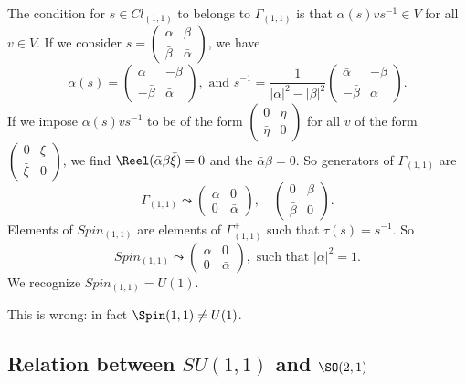 The condition for $s\in Cl_{(1,1)}$ to belongs to $\Gamma_{(1,1)}$ is that $\alpha(s)v s^{-1}\in V$ for all $v\in V$. If we consider $s=
\begin{pmatrix}
\alpha&\beta\\\bar\beta&\bar\alpha
\end{pmatrix}$,
we have
\[ 
  \alpha(s)=
\begin{pmatrix}
\alpha&-\beta\\-\bar\beta&\bar\alpha
\end{pmatrix},
\text{ and }
s^{-1}=\frac{1}{ | \alpha |^2-| \beta |^2 }
\begin{pmatrix}
\bar\alpha&-\beta\\-\bar\beta&\alpha
\end{pmatrix}.
\]
If we impose $\alpha(s)v s^{-1}$ to be of the form $\begin{pmatrix}
0&\eta\\\bar\eta&0
\end{pmatrix}$ for all $v$ of the form $\begin{pmatrix}
0&\xi\\\bar\xi&0
\end{pmatrix}$, we find $\Reel(\bar\alpha\beta\bar\xi)=0$ and the $\bar\alpha\beta=0$. So generators of $\Gamma_{(1,1)}$ are
\begin{equation}
\Gamma_{(1,1)}\leadsto
\begin{pmatrix}
\alpha&0\\0&\bar\alpha
\end{pmatrix},\quad
\begin{pmatrix}
0&\beta\\\bar\beta&0
\end{pmatrix}.
\end{equation}
Elements of $Spin_{(1,1)}$ are elements of $\Gamma_{(1,1)}^+$ such that $\tau(s)=s^{-1}$. So
\begin{equation}
Spin_{(1,1)}\leadsto
\begin{pmatrix}
\alpha&0\\0&\bar\alpha
\end{pmatrix},\text{ such that }| \alpha |^2=1.
\end{equation}
We recognize $Spin_{(1,1)}=U(1)$.

\begin{probleme}
This is wrong: in fact $\Spin(1,1)\neq U(1)$.
\end{probleme}

\subsection{Relation between \texorpdfstring{$SU(1,1)$}{SU(1,1)} and \texorpdfstring{$\SO(2,1)$}{SO(2,1)}}

